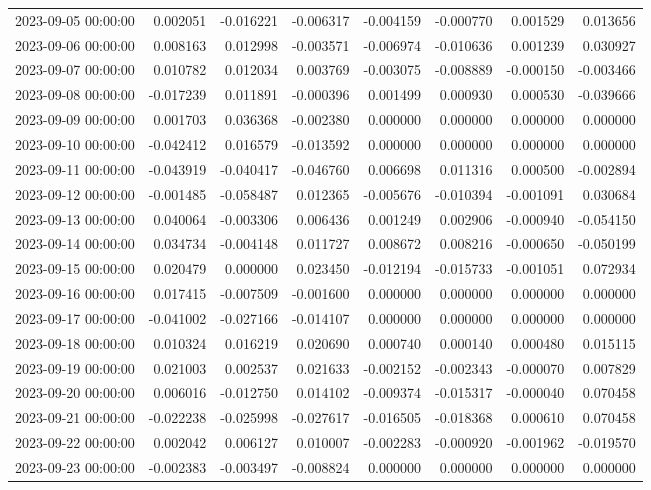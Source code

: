 \begin{tabular}{lrrrrrrr}
2023-09-05 00:00:00 & 0.002051 & -0.016221 & -0.006317 & -0.004159 & -0.000770 & 0.001529 & 0.013656 \\
2023-09-06 00:00:00 & 0.008163 & 0.012998 & -0.003571 & -0.006974 & -0.010636 & 0.001239 & 0.030927 \\
2023-09-07 00:00:00 & 0.010782 & 0.012034 & 0.003769 & -0.003075 & -0.008889 & -0.000150 & -0.003466 \\
2023-09-08 00:00:00 & -0.017239 & 0.011891 & -0.000396 & 0.001499 & 0.000930 & 0.000530 & -0.039666 \\
2023-09-09 00:00:00 & 0.001703 & 0.036368 & -0.002380 & 0.000000 & 0.000000 & 0.000000 & 0.000000 \\
2023-09-10 00:00:00 & -0.042412 & 0.016579 & -0.013592 & 0.000000 & 0.000000 & 0.000000 & 0.000000 \\
2023-09-11 00:00:00 & -0.043919 & -0.040417 & -0.046760 & 0.006698 & 0.011316 & 0.000500 & -0.002894 \\
2023-09-12 00:00:00 & -0.001485 & -0.058487 & 0.012365 & -0.005676 & -0.010394 & -0.001091 & 0.030684 \\
2023-09-13 00:00:00 & 0.040064 & -0.003306 & 0.006436 & 0.001249 & 0.002906 & -0.000940 & -0.054150 \\
2023-09-14 00:00:00 & 0.034734 & -0.004148 & 0.011727 & 0.008672 & 0.008216 & -0.000650 & -0.050199 \\
2023-09-15 00:00:00 & 0.020479 & 0.000000 & 0.023450 & -0.012194 & -0.015733 & -0.001051 & 0.072934 \\
2023-09-16 00:00:00 & 0.017415 & -0.007509 & -0.001600 & 0.000000 & 0.000000 & 0.000000 & 0.000000 \\
2023-09-17 00:00:00 & -0.041002 & -0.027166 & -0.014107 & 0.000000 & 0.000000 & 0.000000 & 0.000000 \\
2023-09-18 00:00:00 & 0.010324 & 0.016219 & 0.020690 & 0.000740 & 0.000140 & 0.000480 & 0.015115 \\
2023-09-19 00:00:00 & 0.021003 & 0.002537 & 0.021633 & -0.002152 & -0.002343 & -0.000070 & 0.007829 \\
2023-09-20 00:00:00 & 0.006016 & -0.012750 & 0.014102 & -0.009374 & -0.015317 & -0.000040 & 0.070458 \\
2023-09-21 00:00:00 & -0.022238 & -0.025998 & -0.027617 & -0.016505 & -0.018368 & 0.000610 & 0.070458 \\
2023-09-22 00:00:00 & 0.002042 & 0.006127 & 0.010007 & -0.002283 & -0.000920 & -0.001962 & -0.019570 \\
2023-09-23 00:00:00 & -0.002383 & -0.003497 & -0.008824 & 0.000000 & 0.000000 & 0.000000 & 0.000000 \\

\end{tabular}
